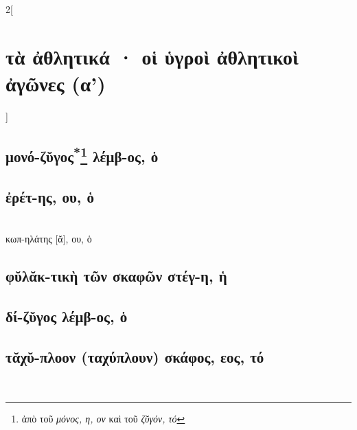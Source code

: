 \documentclass{book}
\begin{document}
\begin{multicols}{2}[\section{τὰ ἀθλητικά · οἱ ὑγροὶ ἀθλητικοὶ ἀγῶνες (α')}]
\subsection{μονό-ζῠγος\textsuperscript{*}\protect\footnote{ἀπὸ τοῦ \emph{μόνος, η, ον} καὶ τοῦ \emph{ζῠγόν, τό}} λέμβ-ος, ὁ}
\subsection{ἐρέτ-ης, ου, ὁ}  ~\\
κωπ-ηλάτης [ᾰ], ου, ὁ 
\subsection{φῠλᾰκ-τικὴ τῶν σκαφῶν στέγ-η, ἡ}
\subsection{δί-ζῠγος λέμβ-ος, ὁ}
\subsection{τᾰχῠ-πλοον (ταχύπλουν) σκάφος, εος, τό}
~
\end{multicols}
\newpage  
\end{document}
